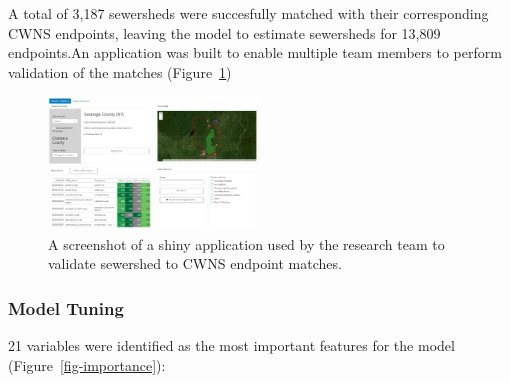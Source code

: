 \documentclass[
  letterpaper,
  DIV=11,
  numbers=noendperiod]{scrartcl}
\begin{document}
A total of 3,187 sewersheds were succesfully matched with their
corresponding CWNS endpoints, leaving the model to estimate sewersheds
for 13,809 endpoints.An application was built to enable multiple team
members to perform validation of the matches (Figure~\ref{fig-match})

\begin{figure}

\includegraphics[width=0.5\textwidth,height=\textheight]{img/App_1.png}

\caption{\label{fig-match}A screenshot of a shiny application used by
the research team to validate sewershed to CWNS endpoint matches.}

\end{figure}%

\subsubsection{Model Tuning}\label{model-tuning}

21 variables were identified as the most important features for the
model (Figure~\ref{fig-importance}):
\end{document}
